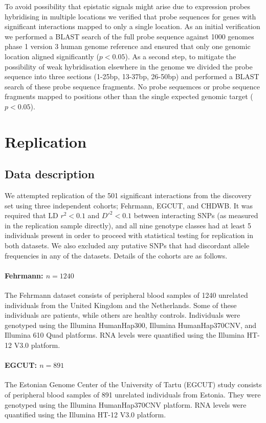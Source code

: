 \documentclass{article}
\begin{document}
To avoid possibility that epistatic signals might arise due to expression probes hybridising in multiple locations we verified that probe sequences for genes with significant interactions mapped to only a single location. As an initial verification we performed a BLAST search of the full probe sequence against 1000 genomes phase 1 version 3 human genome reference and ensured that only one genomic location aligned significantly ($p < 0.05$). As a second step, to mitigate the possibility of weak hybridisation elsewhere in the genome we divided the probe sequence into three sections (1-25bp, 13-37bp, 26-50bp) and performed a BLAST search of these probe sequence fragments. No probe sequemces or probe sequence fragments mapped to positions other than the single expected genomic target ($p < 0.05$).


\section{Replication}


\subsection{Data description}

We attempted replication of the 501 significant interactions from the discovery set using three independent cohorts; Fehrmann, EGCUT, and CHDWB. It was required that LD $r^2 < 0.1$ and $D'^{2} < 0.1$ between interacting SNPs (as measured in the replication sample directly), and all nine genotype classes had at least 5 individuals present in order to proceed with statistical testing for replication in both datasets. We also excluded any putative SNPs that had discordant allele frequencies in any of the datasets. Details of the cohorts are as follows.

\paragraph{Fehrmann: $n=1240$}
The Fehrmann dataset \cite{Fehrmann2011} consists of peripheral blood samples of 1240 unrelated individuals from the United Kingdom and the Netherlands. Some of these individuals are patients, while others are healthy controls. Individuals were genotyped using the Illumina HumanHap300, Illumina HumanHap370CNV, and Illumina 610 Quad platforms. RNA levels were quantified using the Illumina HT-12 V3.0 platform.

\paragraph{EGCUT: $n=891$}
The Estonian Genome Center of the University of Tartu (EGCUT) study \cite{Metspalu2004} consists of peripheral blood samples of 891 unrelated individuals from Estonia. They were genotyped using the Illumina HumanHap370CNV platform. RNA levels were quantified using the Illumina HT-12 V3.0 platform.
\end{document}
